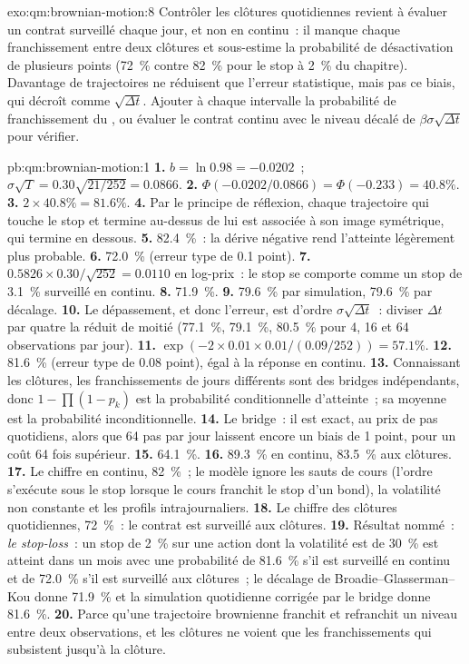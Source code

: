 \begin{solution}{exo:qm:brownian-motion:8}
Contrôler les clôtures quotidiennes revient à évaluer un contrat surveillé chaque jour, et non en continu~: il manque chaque
franchissement entre deux clôtures et sous-estime la probabilité de désactivation de plusieurs points (72~\%
contre 82~\% pour le stop à 2~\% du chapitre). Davantage de trajectoires ne réduisent que l'erreur statistique,
mais pas ce biais, qui décroît comme $\sqrt{\Delta t}$. Ajouter à chaque intervalle la probabilité de franchissement
du , ou évaluer le contrat continu avec le niveau décalé de $\beta\sigma\sqrt{\Delta t}$
pour vérifier.
\end{solution}

\begin{solution}{pb:qm:brownian-motion:1}
\textbf{1.} $b = \ln 0.98 = -0.0202$~; $\sigma\sqrt T = 0.30\sqrt{21/252} = 0.0866$.
\textbf{2.} $\Phi(-0.0202/0.0866) = \Phi(-0.233) = 40.8\%$.
\textbf{3.} $2 \times 40.8\% = 81.6\%$.
\textbf{4.} Par le principe de réflexion, chaque trajectoire qui touche le stop et termine au-dessus de lui est
associée à son image symétrique, qui termine en dessous.
\textbf{5.} 82.4~\%~: la dérive négative rend l'atteinte légèrement plus probable.
\textbf{6.} 72.0~\% (erreur type de 0.1 point).
\textbf{7.} $0.5826 \times 0.30/\sqrt{252} = 0.0110$ en log-prix~: le stop se comporte comme un stop de 3.1~\%
surveillé en continu.
\textbf{8.} 71.9~\%.
\textbf{9.} 79.6~\% par simulation, 79.6~\% par décalage.
\textbf{10.} Le dépassement, et donc l'erreur, est d'ordre $\sigma\sqrt{\Delta t}$~: diviser
$\Delta t$ par quatre la réduit de moitié (77.1~\%, 79.1~\%, 80.5~\% pour 4, 16 et 64 observations par jour).
\textbf{11.} $\exp(-2 \times 0.01 \times 0.01/(0.09/252)) = 57.1\%$.
\textbf{12.} 81.6~\% (erreur type de 0.08 point), égal à la réponse en continu.
\textbf{13.} Connaissant les clôtures, les franchissements de jours différents sont des bridges indépendants, donc $1
- \prod(1 - p_k)$ est la probabilité conditionnelle d'atteinte~; sa moyenne est la probabilité inconditionnelle.
\textbf{14.} Le bridge~: il est exact, au prix de pas quotidiens, alors que 64 pas par jour
laissent encore un biais de 1 point, pour un coût 64 fois supérieur.
\textbf{15.} 64.1~\%.
\textbf{16.} 89.3~\% en continu, 83.5~\% aux clôtures.
\textbf{17.} Le chiffre en continu, 82~\%~; le modèle ignore les sauts de cours (l'ordre s'exécute sous le stop
lorsque le cours franchit le stop d'un bond), la volatilité non constante et les profils intrajournaliers.
\textbf{18.} Le chiffre des clôtures quotidiennes, 72~\%~: le contrat est surveillé aux clôtures.
\textbf{19.} Résultat nommé~: \emph{le stop-loss}~: un stop de 2~\% sur une action dont la volatilité est de 30~\% est atteint
dans un mois avec une probabilité de 81.6~\% s'il est surveillé en continu et de 72.0~\% s'il est surveillé aux
clôtures~; le décalage de Broadie--Glasserman--Kou donne 71.9~\% et la simulation quotidienne corrigée par le
bridge donne 81.6~\%.
\textbf{20.} Parce qu'une trajectoire brownienne franchit et refranchit un niveau entre deux observations, et
les clôtures ne voient que les franchissements qui subsistent jusqu'à la clôture.
\end{solution}

